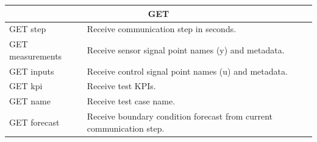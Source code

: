 \documentclass{article}
\begin{document}
\begin{table}
{\begin{tabular}{p{150pt}|p{150pt}}
\hline
\multicolumn{2}{c}{GET}                                                                                                                                                                                                                                                                                                               \\
\hline
GET step                                                                                                                                               & Receive communication step in seconds.                                                                                                                                       \\
\hline
GET measurements                                                                                                                                       & Receive sensor signal point names (y) and metadata.                                                                                                                          \\
\hline
GET inputs                                                                                                                                             & Receive control signal point names (u) and metadata.                                                                                                                         \\
\hline
GET kpi                                                                                                                                                & Receive test KPIs.                                                                                                                                                           \\
\hline
GET name                                                                                                                                               & Receive test case name.                                                                                                                                                      \\
\hline
GET forecast                                                                                                                                           & Receive boundary condition forecast from current communication step.                                                                                                         \\

\end{tabular}}
\end{table}
\end{document}
